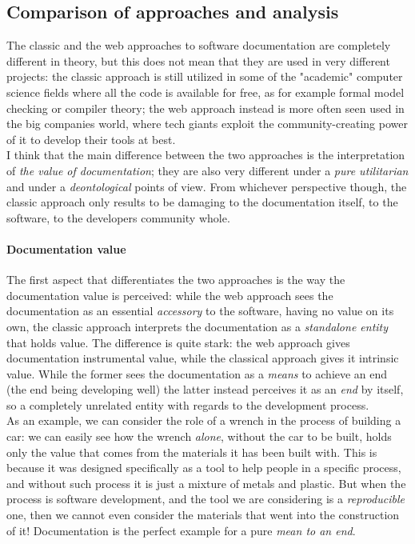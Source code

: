 \documentclass{article}
\begin{document}
		\subsection{Comparison of approaches and analysis}
			The classic and the web approaches to software documentation are completely different in theory, but this does not mean that they are used in very different projects: the classic approach is still utilized in some of the "academic" computer science fields where all the code is available for free, as for example formal model checking or compiler theory; the web approach instead is more often seen used in the big companies world, where tech giants exploit the community-creating power of it to develop their tools at best.\\
			I think that the main difference between the two approaches is the interpretation of \textit{the value of documentation}; they are also very different under a \textit{pure utilitarian} and under a \textit{deontological} points of view. From whichever perspective though, the classic approach only results to be damaging to the documentation itself, to the software, to the developers community whole.

			\paragraph{Documentation value}
				The first aspect that differentiates the two approaches is the way the documentation value is perceived: while the web approach sees the documentation as an essential \textit{accessory} to the software, having no value on its own, the classic approach interprets the documentation as a \textit{standalone entity} that holds value. The difference is quite stark: the web approach gives documentation instrumental value, while the classical approach gives it intrinsic value. While the former sees the documentation as a \textit{means} to achieve an end (the end being developing well) the latter instead perceives it as an \textit{end} by itself, so a completely unrelated entity with regards to the development process.\\
				As an example, we can consider the role of a wrench in the process of building a car: we can easily see how the wrench \textit{alone}, without the car to be built, holds only the value that comes from the materials it has been built with. This is because it was designed specifically as a tool to help people in a specific process, and without such process it is just a mixture of metals and plastic. But when the process is software development, and the tool we are considering is a \textit{reproducible} one, then we cannot even consider the materials that went into the construction of it! Documentation is the perfect example for a pure \textit{mean to an end}.
\end{document}
